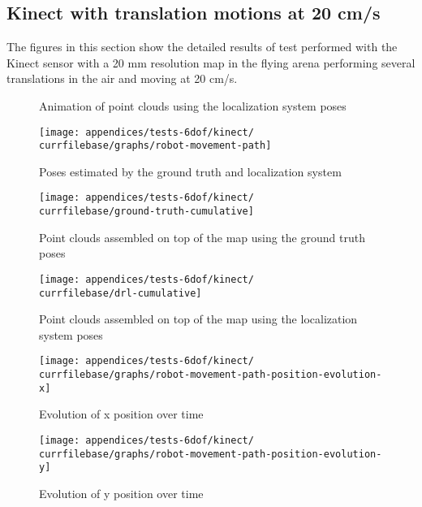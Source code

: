 \subsection{Kinect with translation motions at 20 cm/s}

The figures in this section show the detailed results of test performed with the Kinect sensor with a 20 mm resolution map in the flying arena performing several translations in the air and moving at 20 cm/s.


\begin{figure}[H]
	\centering
	\caption{Animation of point clouds using the localization system poses}
\end{figure}

\begin{figure}[H]
	\centering
	\texttt{[image: appendices/tests-6dof/kinect/\\currfilebase/graphs/robot-movement-path]}
	\caption{Poses estimated by the ground truth and localization system}
\end{figure}


\begin{figure}[H]
	\centering
	\texttt{[image: appendices/tests-6dof/kinect/\\currfilebase/ground-truth-cumulative]}
	\caption{Point clouds assembled on top of the map using the ground truth poses}
\end{figure}

\begin{figure}[H]
	\centering
	\texttt{[image: appendices/tests-6dof/kinect/\\currfilebase/drl-cumulative]}
	\caption{Point clouds assembled on top of the map using the localization system poses}
\end{figure}


\begin{figure}[H]
	\centering
	\texttt{[image: appendices/tests-6dof/kinect/\\currfilebase/graphs/robot-movement-path-position-evolution-x]}
	\caption{Evolution of x position over time}
\end{figure}

\begin{figure}[H]
	\centering
	\texttt{[image: appendices/tests-6dof/kinect/\\currfilebase/graphs/robot-movement-path-position-evolution-y]}
	\caption{Evolution of y position over time}
\end{figure}


